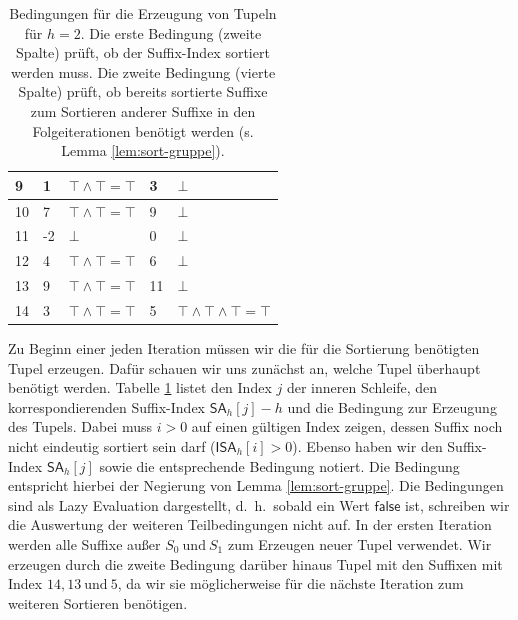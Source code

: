\begin{table}[]
\begin{tabular}{|l|l|l|l|l|}
9   & 1               & $\top \wedge \top = \top$   & 3            & $\bot$                                                                                                                            \\ \hline
10  & 7               & $\top \wedge \top = \top$   & 9            & $\bot$                                                                                                                            \\ \hline
11  & -2              & $\bot$                      & 0            & $\bot$                                                                                                                            \\ \hline
12  & 4               & $\top \wedge \top = \top$   & 6            & $\bot$                                                                                                                            \\ \hline
13  & 9               & $\top \wedge \top = \top$   & 11           & $\bot$                                                                                                                            \\ \hline
14  & 3               & $\top \wedge \top = \top$   & 5            & $\top \wedge \top \wedge \top = \top$                                                                                             \\ \hline
\end{tabular}
\caption{Bedingungen für die Erzeugung von Tupeln für $h=2$. Die erste Bedingung (zweite Spalte) prüft, ob der Suffix-Index sortiert werden muss. Die zweite Bedingung (vierte Spalte) prüft, ob bereits sortierte Suffixe zum Sortieren anderer Suffixe in den Folgeiterationen benötigt werden (s. Lemma \ref{lem:sort-gruppe}).}
\label{tab:osipov-tupel-cond}
\end{table}

Zu Beginn einer jeden Iteration müssen wir die für die Sortierung benötigten Tupel erzeugen. Dafür schauen wir uns zunächst an, welche Tupel überhaupt benötigt werden. Tabelle \ref{tab:osipov-tupel-cond} listet den Index $j$ der inneren Schleife, den korrespondierenden Suffix-Index $\mathsf{SA}_h[j]-h$ und die Bedingung zur Erzeugung des Tupels. Dabei muss $i>0$ auf einen gültigen Index zeigen, dessen Suffix noch nicht eindeutig sortiert sein darf ($\mathsf{ISA}_h[i] > 0$). Ebenso haben wir den Suffix-Index $\mathsf{SA}_h[j]$ sowie die entsprechende Bedingung notiert. Die Bedingung entspricht hierbei der Negierung von Lemma \ref{lem:sort-gruppe}. Die Bedingungen sind als Lazy Evaluation dargestellt, d.~h.\ sobald ein Wert $\mathsf{false}$ ist, schreiben wir die Auswertung der weiteren Teilbedingungen nicht auf. In der ersten Iteration werden alle Suffixe außer $S_0 ~\text{und}~ S_1$ zum Erzeugen neuer Tupel verwendet. Wir erzeugen durch die zweite Bedingung darüber hinaus Tupel mit den Suffixen mit Index $14, 13 ~\text{und}~ 5$, da wir sie möglicherweise für die nächste Iteration zum weiteren Sortieren benötigen.

